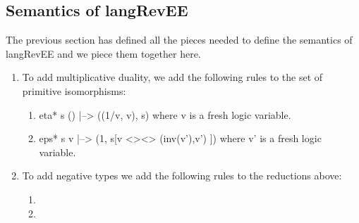 \documentclass[preprint]{sigplanconf}
\begin{document}
\subsection{Semantics of {{langRevEE}} }

The previous section has defined all the pieces needed to define the
semantics of {{langRevEE}} and we piece them together here. 

\begin{enumerate}
\item 
To add multiplicative duality, we add the following rules to the set
of primitive isomorphisms:

\begin{enumerate}
\item {{eta* s () |--> ((1/v, v), s)}}
  where {{v}} is a fresh logic variable. 

\item {{eps* s v |--> (1, s[v <><> (inv(v'),v') ])}}
  where {{v'}} is a fresh logic variable. 

\end{enumerate}

\item To add negative types we add the following rules to the
  reductions above: 

  \begin{enumerate}
  \item 


    \item

  \end{enumerate}


\end{enumerate}

\end{document}
